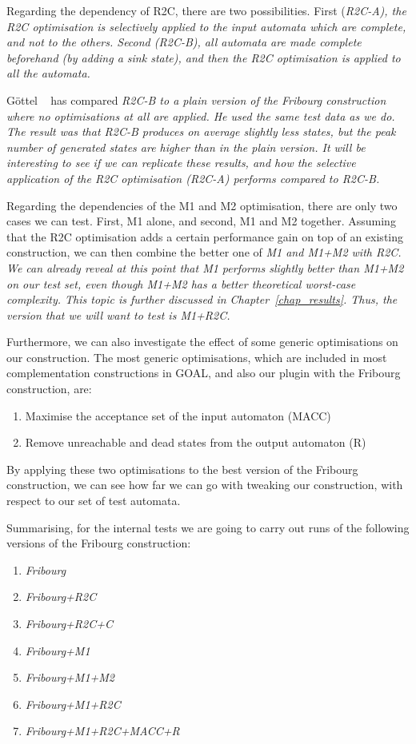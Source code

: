 Regarding the dependency of R2C, there are two possibilities. First (\em{R2C-A}), the R2C optimisation is selectively applied to the input automata which are complete, and not to the others. Second (\em{R2C-B}), all automata are made complete beforehand (by adding a sink state), and then the R2C optimisation is applied to all the automata.

Göttel ~\cite{2013_bsc_goettel} has compared \em{R2C-B} to a plain version of the Fribourg construction where no optimisations at all are applied. He used the same test data as we do. The result was that \em{R2C-B} produces on average slightly less states, but the peak number of generated states are higher than in the plain version. It will be interesting to see if we can replicate these results, and how the selective application of the R2C optimisation (\em{R2C-A}) performs compared to \em{R2C-B}.

Regarding the dependencies of the M1 and M2 optimisation, there are only two cases we can test. First, M1 alone, and second, M1 and M2 together. Assuming that the R2C optimisation adds a certain performance gain on top of an existing construction, we can then combine the better one of \em{M1} and \em{M1+M2} with R2C. We can already reveal at this point that \em{M1} performs slightly better than \em{M1+M2} on our test set, even though \em{M1+M2} has a better theoretical worst-case complexity. This topic is further discussed in Chapter~\ref{chap_results}. Thus, the version that we will want to test is \em{M1+R2C}.

Furthermore, we can also investigate the effect of some generic optimisations on our construction. The most generic optimisations, which are included in most complementation constructions in GOAL, and also our plugin with the Fribourg construction, are:
\begin{enumerate}
\item Maximise the acceptance set of the input automaton (MACC)
\item Remove unreachable and dead states from the output automaton (R)
\end{enumerate}

By applying these two optimisations to the best version of the Fribourg construction, we can see how far we can go with tweaking our construction, with respect to our set of test automata.

Summarising, for the internal tests we are going to carry out runs of the following versions of the Fribourg construction:
\begin{enumerate}
\item \em{Fribourg}
\item \em{Fribourg+R2C}
\item \em{Fribourg+R2C+C}
\item \em{Fribourg+M1}
\item \em{Fribourg+M1+M2}
\item \em{Fribourg+M1+R2C}
\item \em{Fribourg+M1+R2C+MACC+R}
\end{enumerate}


